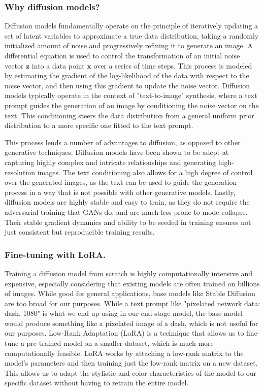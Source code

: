 \documentclass[sigconf, nonacm]{acmart}
\begin{document}
\subsubsection{Why diffusion models?}
Diffusion models fundamentally operate on the principle of iteratively updating
a set of latent variables to approximate a true data distribution, taking
a randomly initialized amount of noise and progressively refining it to
generate an image. A differential equation is used to control the transformation
of an initial noise vector $\mathbf{z}$ into a data point $\mathbf{x}$ over a 
series of time steps. This process is modeled by estimating the gradient of the
log-likelihood of the data with respect to the noise vector, and then using this
gradient to update the noise vector. Diffusion models typically operate in the
context of "text-to-image" synthesis, where a text prompt guides the 
generation of an image by conditioning the noise vector on the text. This
conditioning steers the data distribution from a general uniform prior distribution
to a more specific one fitted to the text prompt.

This process lends a number of advantages to diffusion, as opposed to other
generative techniques. Diffusion models have been shown to be adept at capturing
highly complex and intricate relationships and generating high-resolution
images. The text conditioning also allows for a high degree of control over
the generated images, as the text can be used to guide the generation process
in a way that is not possible with other generative models. Lastly,
diffusion models are highly stable and easy to train, as they do not require
the adversarial training that GANs do, and are much less prone to mode collapse.
Their stable gradient dynamics and ability to be seeded in training
ensures not just consistent but reproducible training results.

\subsubsection{Fine-tuning with LoRA.} Training a diffusion model from scratch
is highly computationally intensive and expensive, especially considering that
existing models are often trained on billions of images. While good for general
applications, base models like Stable Diffusion are too broad for our purposes. 
While a text prompt like "pixelated network data: dash, 1080" is what we end up 
using in our end-stage model, the base model would produce something 
like a pixelated image of a dash, which is not useful for our purposes. Low-Rank
Adaptation (LoRA) is a technique that allows us to fine-tune a pre-trained model
on a smaller dataset, which is much more computationally feasible. LoRA works by
attaching a low-rank matrix to the model's parameters and then training just 
the low-rank matrix on a new dataset. This allows us to adapt the stylistic and
color characteristics of the model to our specific dataset without having to
retrain the entire model.
\end{document}
